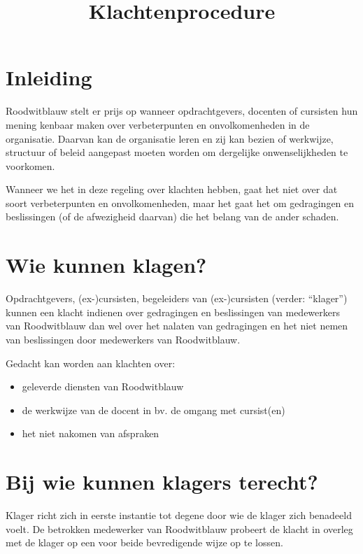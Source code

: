 \documentclass[a4paper]{article}
\begin{document}
\title{Klachtenprocedure}
\date{}
\maketitle

\section*{Inleiding}

Roodwitblauw stelt er prijs op wanneer opdrachtgevers, docenten of cursisten hun mening kenbaar maken over verbeterpunten en onvolkomenheden in de organisatie. Daarvan kan de organisatie leren en zij kan bezien of werkwijze, structuur of beleid aangepast moeten worden om dergelijke onwenselijkheden te voorkomen.

Wanneer we het in deze regeling over klachten hebben, gaat het niet over dat soort verbeterpunten en onvolkomenheden, maar het gaat het om gedragingen en beslissingen (of de afwezigheid daarvan) die het belang van de ander schaden.

\section*{Wie kunnen klagen?}

Opdrachtgevers, (ex-)cursisten, begeleiders van (ex-)cursisten (verder: ``klager'') kunnen een klacht indienen over gedragingen en beslissingen van medewerkers van Roodwitblauw dan wel over het nalaten van gedragingen en het niet nemen van beslissingen door medewerkers van Roodwitblauw.

Gedacht kan worden aan klachten over:

\begin{itemize}
	\item geleverde diensten van Roodwitblauw
	\item de werkwijze van de docent in bv. de omgang met cursist(en)
	\item het niet nakomen van afspraken
\end{itemize}

\section*{Bij wie kunnen klagers terecht?}

Klager richt zich in eerste instantie tot degene door wie de klager zich benadeeld voelt. De betrokken medewerker van Roodwitblauw probeert de klacht in overleg met de klager op een voor beide bevredigende wijze op te lossen.
\end{document}
